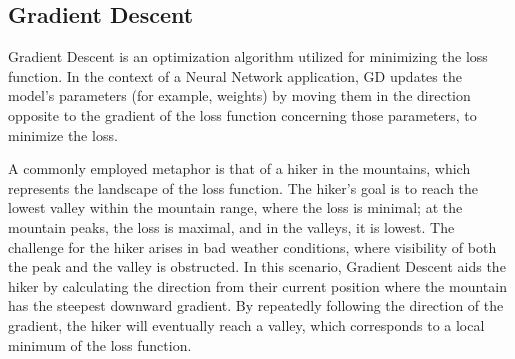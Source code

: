 \documentclass[oneside]{article}
\begin{document}
\subsection{Gradient Descent}
Gradient Descent is an optimization algorithm utilized for minimizing the loss function. In the context of a Neural Network application, GD updates the model's parameters (for example, weights) by moving them in the direction opposite to the gradient of the loss function concerning those parameters, to minimize the loss.\par
A commonly employed metaphor is that of a hiker in the mountains, which represents the landscape of the loss function. The hiker's goal is to reach the lowest valley within the mountain range, where the loss is minimal; at the mountain peaks, the loss is maximal, and in the valleys, it is lowest. The challenge for the hiker arises in bad weather conditions, where visibility of both the peak and the valley is obstructed. In this scenario, Gradient Descent aids the hiker by calculating the direction from their current position where the mountain has the steepest downward gradient. By repeatedly following the direction of the gradient, the hiker will eventually reach a valley, which corresponds to a local minimum of the loss function.\par
\end{document}
